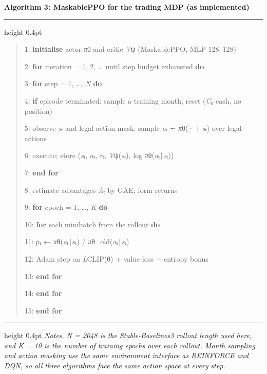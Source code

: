 \begin{algobox}
\textbf{Algorithm 3: MaskablePPO for the trading MDP (as implemented)}
\par\vspace{4pt}\hrule height 0.4pt\vspace{2pt}
\begin{quote}
1: \textbf{initialise} actor \emph{π}θ and critic \emph{V}ψ
(MaskablePPO, MLP 128--128)

2: \textbf{for} iteration = 1, 2, \ldots{} until step budget exhausted
\textbf{do}

3: \textbf{for} step = 1, \ldots, \emph{N} \textbf{do}

4: \textbf{if} episode terminated: sample a training month; reset
(\emph{C}₀ cash, no position)

5: observe \emph{s}ₜ and legal-action mask; sample \emph{a}ₜ ∼
\emph{π}θ(· ∣ \emph{s}ₜ) over legal actions

6: execute; store (\emph{s}ₜ, \emph{a}ₜ, \emph{r}ₜ,
\emph{V}ψ(\emph{s}ₜ), log \emph{π}θ(\emph{a}ₜ∣\emph{s}ₜ))

7: \textbf{end for}

8: estimate advantages \emph{Â}ₜ by GAE; form returns

9: \textbf{for} epoch = 1, \ldots, \emph{K} \textbf{do}

10: \textbf{for} each minibatch from the rollout \textbf{do}

11: \emph{ρ}ₜ ← \emph{π}θ(\emph{a}ₜ∣\emph{s}ₜ) /
\emph{π}θ\_old(\emph{a}ₜ∣\emph{s}ₜ)

12: Adam step on \emph{L}CLIP(θ) + value loss − entropy bonus

13: \textbf{end for}

14: \textbf{end for}

15: \textbf{end for}
\end{quote}
\par\vspace{2pt}\hrule height 0.4pt\vspace{2pt}
\emph{Notes. N = 2048 is the Stable-Baselines3 rollout length used here,
and K = 10 is the number of training epochs over each rollout. Month
sampling and action masking use the same environment interface as
REINFORCE and DQN, so all three algorithms face the same action space at
every step.}
\end{algobox}
